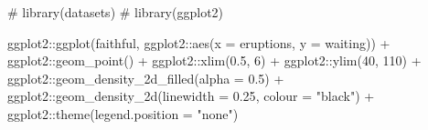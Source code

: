 \documentclass[
12pt,
openright,
oneside,
a4paper,
chapter=TITLE,
section=TITLE,
french,
spanish,
brazil,
english
]{abntex2}\usepackage{array}
\newenvironment{Shaded}{\begin{snugshade}}{\end{snugshade}}
\newcommand{\AttributeTok}[1]{\textcolor[rgb]{0.40,0.45,0.13}{#1}}
\newcommand{\CommentTok}[1]{\textcolor[rgb]{0.37,0.37,0.37}{#1}}
\newcommand{\DecValTok}[1]{\textcolor[rgb]{0.68,0.00,0.00}{#1}}
\newcommand{\FloatTok}[1]{\textcolor[rgb]{0.68,0.00,0.00}{#1}}
\newcommand{\FunctionTok}[1]{\textcolor[rgb]{0.28,0.35,0.67}{#1}}
\newcommand{\NormalTok}[1]{\textcolor[rgb]{0.00,0.23,0.31}{#1}}
\newcommand{\SpecialCharTok}[1]{\textcolor[rgb]{0.37,0.37,0.37}{#1}}
\newcommand{\StringTok}[1]{\textcolor[rgb]{0.13,0.47,0.30}{#1}}
\theoremstyle{plain}
\theoremstyle{remark}
\begin{document}
\begin{Shaded}
\begin{Highlighting}[numbers=left,,]
\CommentTok{\# library(datasets)}
\CommentTok{\# library(ggplot2)}

\NormalTok{ggplot2}\SpecialCharTok{::}\FunctionTok{ggplot}\NormalTok{(faithful, ggplot2}\SpecialCharTok{::}\FunctionTok{aes}\NormalTok{(}\AttributeTok{x =}\NormalTok{ eruptions, }\AttributeTok{y =}\NormalTok{ waiting)) }\SpecialCharTok{+}
\NormalTok{  ggplot2}\SpecialCharTok{::}\FunctionTok{geom\_point}\NormalTok{() }\SpecialCharTok{+}
\NormalTok{  ggplot2}\SpecialCharTok{::}\FunctionTok{xlim}\NormalTok{(}\FloatTok{0.5}\NormalTok{, }\DecValTok{6}\NormalTok{) }\SpecialCharTok{+}
\NormalTok{  ggplot2}\SpecialCharTok{::}\FunctionTok{ylim}\NormalTok{(}\DecValTok{40}\NormalTok{, }\DecValTok{110}\NormalTok{) }\SpecialCharTok{+}
\NormalTok{  ggplot2}\SpecialCharTok{::}\FunctionTok{geom\_density\_2d\_filled}\NormalTok{(}\AttributeTok{alpha =} \FloatTok{0.5}\NormalTok{) }\SpecialCharTok{+}
\NormalTok{  ggplot2}\SpecialCharTok{::}\FunctionTok{geom\_density\_2d}\NormalTok{(}\AttributeTok{linewidth =} \FloatTok{0.25}\NormalTok{, }\AttributeTok{colour =} \StringTok{"black"}\NormalTok{) }\SpecialCharTok{+}
\NormalTok{  ggplot2}\SpecialCharTok{::}\FunctionTok{theme}\NormalTok{(}\AttributeTok{legend.position =} \StringTok{"none"}\NormalTok{)}
\end{Highlighting}
\end{Shaded}
\end{document}

